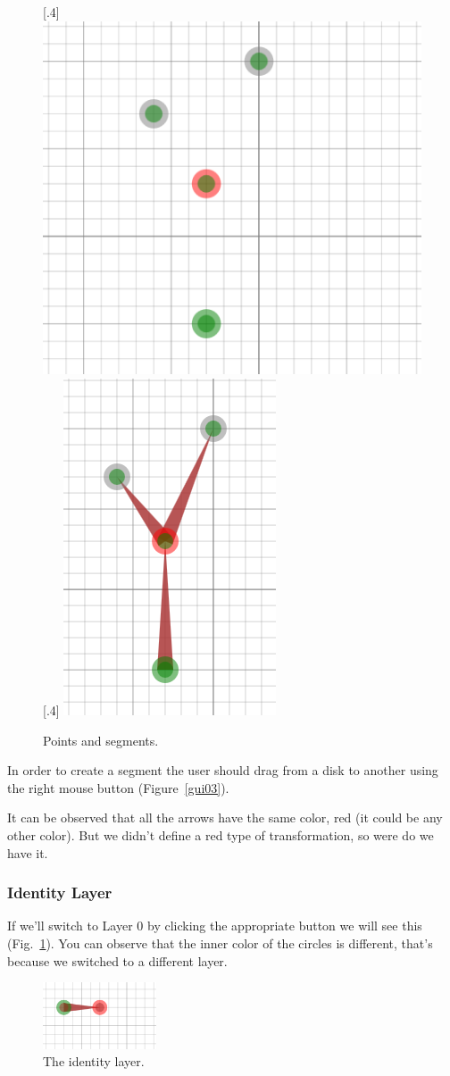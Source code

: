             \begin{figure}[ht]
                \centering
                \caption{Points and segments.}
                [.4\linewidth]
                    {\includegraphics[height=0.35\textwidth]{img/gui02.png}}
                [.4\linewidth]
                    {\includegraphics[height=0.35\textwidth]{img/gui03.png}}

            \end{figure}

            In order to create a segment the user should drag from a disk to another using the right mouse button (Figure~\ref{gui03}).

            \FloatBarrier

            It can be observed that all the arrows have the same color, red (it could be any other color). 
            But we didn't define a red type of transformation, so were do we have it.


        \subsubsection{Identity Layer}

            If we'll switch to Layer 0 by clicking the appropriate button we will see this (Fig.~\ref{identity01}).
            You can observe that the inner color of the circles is different, that's because we switched to a different layer.

            \begin{figure}[ht]
                \caption{\label{identity01} The identity layer.}
                \centering
                \includegraphics[width=0.3\textwidth]{img/identity01.png}
            \end{figure}

